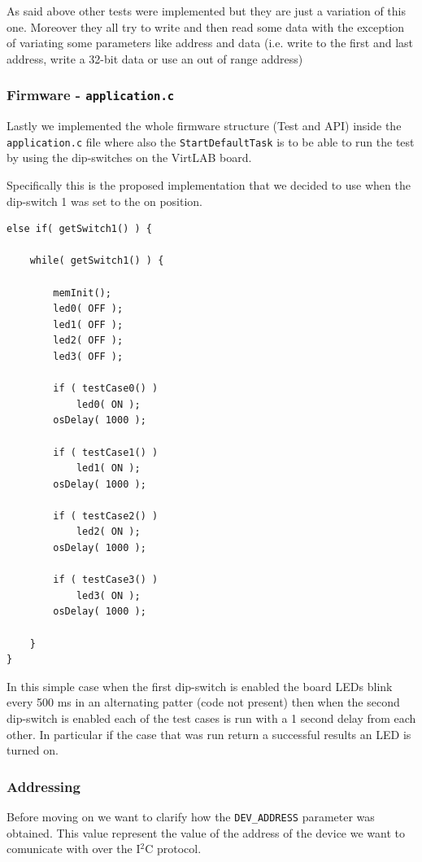 \documentclass[../main.tex]{subfiles}
\begin{document}
As said above other tests were implemented but they are just a variation of this one. Moreover they all try to write and then read some data with the exception of variating some parameters like address and data (i.e. write to the first and last address, write a 32-bit data or use an out of range address)

\subsubsection*{Firmware - \texttt{application.c}}

Lastly we implemented the whole firmware structure (Test and API) inside the \texttt{application.c} file where also the \texttt{StartDefaultTask} is to be able to run the test by using the dip-switches on the VirtLAB board.

Specifically this is the proposed implementation that we decided to use when the dip-switch 1 was set to the on position.\\

\begin{lstlisting}	
else if( getSwitch1() ) { 

	while( getSwitch1() ) {

		memInit();			
		led0( OFF );
		led1( OFF );
		led2( OFF );
		led3( OFF );

		if ( testCase0() )
			led0( ON );
		osDelay( 1000 );
			
		if ( testCase1() )
			led1( ON );
		osDelay( 1000 );
	
		if ( testCase2() )
			led2( ON );
		osDelay( 1000 );

		if ( testCase3() )
			led3( ON );
		osDelay( 1000 );

	}
}	
\end{lstlisting}

\vspace{0.5cm}

In this simple case when the first dip-switch is enabled the board LEDs blink every 500 ms in an alternating patter (code not present) then when the second dip-switch is enabled each of the test cases is run with a 1 second delay from each other.
In particular if the case that was run return a successful results an LED is turned on.


\subsubsection*{Addressing}

Before moving on we want to clarify how the \texttt{DEV\_ADDRESS} parameter was obtained. This value represent the value of the address of the device we want to comunicate with over the I$^2$C protocol. \\
\end{document}
